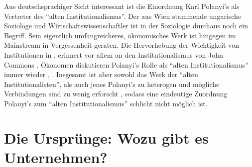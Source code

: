 Aus deutschsprachiger Sicht interessant ist die Einordnung Karl Polanyi's als Vertreter des "`alten Institutionalismus"'. Der aus Wien stammende ungarische Soziologe und Wirtschaftswissenschaftler ist in der Soziologie durchaus noch ein Begriff. Sein eigentlich umfangreicheres, ökonomisches Werk ist hingegen im Mainstream in Vergessenheit geraten. Die Hervorhebung der Wichtigkeit von Institutionen in \textcite{Polanyi1944}, erinnert vor allem an den Institutionalismus von John Commons \parencite{Maucourant1995}. Ökonomen diskutieren Polanyi's Rolle als "`alten Institutionalismus"' immer wieder \parencite[S. 183]{Hodgson1998}, \parencite{Cangiani2011}. Insgesamt ist aber sowohl das Werk der "`alten Institutionalisten"', als auch jenes Polanyi's zu heterogen und mögliche Verbindungen sind zu wenig erforscht \parencite{Frerichs2024}, sodass eine eindeutige Zuordnung Polanyi's zum "`alten Institutionalismus"' schlicht nicht möglich ist.


\section{Die Ursprünge: Wozu gibt es Unternehmen?}
\label{sec: Neue Inst}

